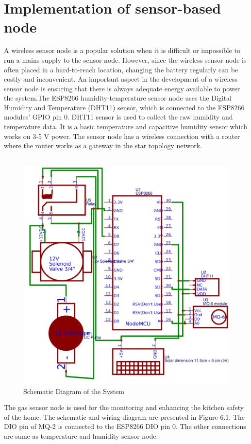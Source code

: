 \section{Implementation of sensor-based node}
A wireless sensor node is a popular solution when it is difficult or impossible to run a mains supply to the sensor node. However, since the wireless sensor node is often placed in a hard-to-reach location, changing the battery regularly can be costly and inconvenient. An important aspect in the development of a wireless sensor node is ensuring that there is always adequate energy available to power the system.The ESP8266 humidity-temperature sensor node uses the Digital Humidity and Temperature (DHT11) sensor, which is connected to the ESP8266 modules’ GPIO pin 0. DHT11 sensor is used to collect the raw humidity and temperature data. It is a basic temperature and capacitive humidity sensor which works on 3-5 V power. The sensor node has a wireless connection with a router where the router works as a gateway in the star topology network.\\\\
\begin{figure}[H]
  \centering
  \includegraphics[width=5in]{35}
  \caption{Schematic Diagram of the System}\label{fig35}
\end{figure}
The gas sensor node is used for the monitoring and enhancing the kitchen safety of the home. The schematic and wiring diagram are presented in Figure 6.1. The DIO pin of MQ-2 is connected to the ESP8266 DIO pin 0. The other connections are same as temperature and humidity sensor node.\\

